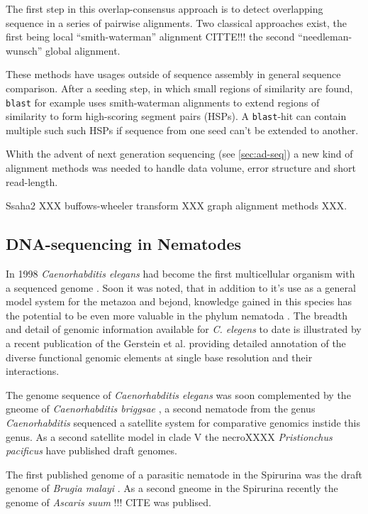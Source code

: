 The first step in this overlap-consensus approach is to detect
overlapping sequence in a series of pairwise alignments. Two classical
approaches exist, the first being local ``smith-waterman'' alignment
CITTE!!! the second ``needleman-wunsch'' global alignment.

These methods have usages outside of sequence assembly in general
sequence comparison. After a seeding step, in which small regions of
similarity are found, \texttt{blast} for example uses smith-waterman
alignments to extend regions of similarity to form high-scoring
segment pairs (HSPs). A \texttt{blast}-hit can contain multiple such
such HSPs if sequence from one seed can't be extended to another.

Whith the advent of next generation sequencing (see \ref{sec:ad-seq})
a new kind of alignment methods was needed to handle data volume,
error structure and short read-length. 

Ssaha2 XXX buffows-wheeler transform XXX graph alignment methods XXX.

\subsection{DNA-sequencing in Nematodes}
\label{sec:dna-sequ-nemat}

In 1998 \textit{Caenorhabditis elegans} had become the first
multicellular organism with a sequenced genome
\cite{pmid9851916}. Soon it was noted, that in addition to it's use as
a general model system for the metazoa and bejond, knowledge gained in
this species has the potential to be even more valuable in the phylum
nematoda \cite{blaxter_caenorhabditis_1998}. The breadth and detail of
genomic information available for \textit{C. elegens} to date is
illustrated by a recent publication of the Gerstein et
al. \cite{pmid21177976} providing detailed annotation of the diverse
functional genomic elements at single base resolution and their
interactions.

The genome sequence of \textit{Caenorhabditis elegans} was soon
complemented by the gneome of \textit{Caenorhabditis briggsae}
\cite{stein_genome_2003}, a second nematode from the genus
\textit{Caenorhabditis} sequenced a satellite system for comparative
genomics instide this genus. As a second satellite model in clade V
the necroXXXX \textit{Pristionchus pacificus} have published draft
genomes.

The first published genome of a parasitic nematode in the Spirurina
was the draft genome of \textit{Brugia malayi}
\cite{ghedin_draft_2007}. As a second gneome in the Spirurina recently
the genome of \textit{Ascaris suum} !!! CITE was publised.

